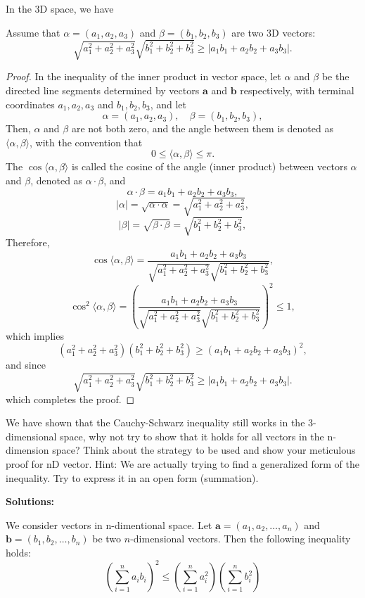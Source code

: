In the 3D space, we have
\begin{corollary}
    Assume that $\alpha = (a_1, a_2, a_3)$ and $\beta = (b_1, b_2, b_3)$ are two 3D vectors:
    \[
\sqrt{a_1^2 + a_2^2 + a_3^2}\sqrt{b_1^2 + b_2^2 + b_3^2} \geq |a_1b_1 + a_2b_2 + a_3b_3|.
\] 
\end{corollary}
\begin{proof}
    In the inequality of the inner product in vector space, let \( \alpha \) and \( \beta \) be the directed line segments determined by vectors \(\mathbf{a}\) and \(\mathbf{b}\) respectively, with terminal coordinates \( a_1, a_2, a_3 \) and \( b_1, b_2, b_3 \), and let
\[
\alpha = (a_1, a_2, a_3), \quad \beta = (b_1, b_2, b_3),
\]
Then, \( \alpha \) and \( \beta \) are not both zero, and the angle between them is denoted as \( \langle \alpha, \beta \rangle \), with the convention that
\[
0 \leq \langle \alpha, \beta \rangle \leq \pi.
\]
The \( \cos\langle \alpha, \beta \rangle \) is called the cosine of the angle (inner product) between vectors \( \alpha \) and \( \beta \), denoted as \( \alpha \cdot \beta \), and
\[
\alpha \cdot \beta = a_1b_1 + a_2b_2 + a_3b_3,
\]
\[
|\alpha| = \sqrt{\alpha \cdot \alpha} = \sqrt{a_1^2 + a_2^2 + a_3^2},
\]
\[
|\beta| = \sqrt{\beta \cdot \beta} = \sqrt{b_1^2 + b_2^2 + b_3^2},
\]
Therefore,
\[
\cos\langle \alpha, \beta \rangle = \frac{a_1b_1 + a_2b_2 + a_3b_3}{\sqrt{a_1^2 + a_2^2 + a_3^2}\sqrt{b_1^2 + b_2^2 + b_3^2}},
\]
\[
\cos^2\langle \alpha, \beta \rangle = \left(\frac{a_1b_1 + a_2b_2 + a_3b_3}{\sqrt{a_1^2 + a_2^2 + a_3^2}\sqrt{b_1^2 + b_2^2 + b_3^2}}\right)^2 \leq 1,
\]
which implies
\[
(a_1^2 + a_2^2 + a_3^2)(b_1^2 + b_2^2 + b_3^2) \geq (a_1b_1 + a_2b_2 + a_3b_3)^2,
\]
and since
\[
\sqrt{a_1^2 + a_2^2 + a_3^2}\sqrt{b_1^2 + b_2^2 + b_3^2} \geq |a_1b_1 + a_2b_2 + a_3b_3|.
\]
which completes the proof.
\end{proof}
\begin{exercise}
    We have shown that the Cauchy-Schwarz inequality still works in the 3-dimensional space, why not try
    to show that it holds for all vectors in the n-dimension space? Think about the strategy to be used and show your 
    meticulous proof for nD vector. Hint: We are actually trying to find a generalized form of the inequality.
    Try to express it in an open form (summation).
\end{exercise}
\textbf{Solutions:}
\begin{theorem}\label{gcsineq}
    We consider vectors in n-dimentional space.
    Let \( \mathbf{a} = (a_1, a_2, \ldots, a_n) \) and \( \mathbf{b} = (b_1, b_2, \ldots, b_n) \) be two \( n \)-dimensional vectors. Then the following inequality holds:
\[
\left(\sum_{i=1}^{n} a_i b_i\right)^2 \leq \left(\sum_{i=1}^{n} a_i^2\right) \left(\sum_{i=1}^{n} b_i^2\right)
\]
\end{theorem}
